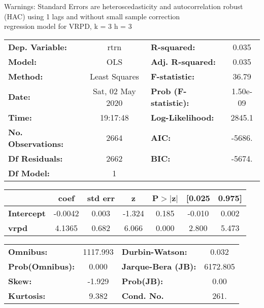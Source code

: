 Warnings: \newline
 [1] Standard Errors are heteroscedasticity and autocorrelation robust (HAC) using 1 lags and without small sample correction\\ 

regression model for VRPD, k = 3 h = 3\begin{center}
\begin{tabular}{lclc}
\toprule
\textbf{Dep. Variable:}    &       rtrn       & \textbf{  R-squared:         } &     0.035   \\
\textbf{Model:}            &       OLS        & \textbf{  Adj. R-squared:    } &     0.035   \\
\textbf{Method:}           &  Least Squares   & \textbf{  F-statistic:       } &     36.79   \\
\textbf{Date:}             & Sat, 02 May 2020 & \textbf{  Prob (F-statistic):} &  1.50e-09   \\
\textbf{Time:}             &     19:17:48     & \textbf{  Log-Likelihood:    } &    2845.1   \\
\textbf{No. Observations:} &        2664      & \textbf{  AIC:               } &    -5686.   \\
\textbf{Df Residuals:}     &        2662      & \textbf{  BIC:               } &    -5674.   \\
\textbf{Df Model:}         &           1      & \textbf{                     } &             \\
\bottomrule
\end{tabular}
\begin{tabular}{lcccccc}
                   & \textbf{coef} & \textbf{std err} & \textbf{z} & \textbf{P$> |$z$|$} & \textbf{[0.025} & \textbf{0.975]}  \\
\midrule
\textbf{Intercept} &      -0.0042  &        0.003     &    -1.324  &         0.185        &       -0.010    &        0.002     \\
\textbf{vrpd}      &       4.1365  &        0.682     &     6.066  &         0.000        &        2.800    &        5.473     \\
\bottomrule
\end{tabular}
\begin{tabular}{lclc}
\textbf{Omnibus:}       & 1117.993 & \textbf{  Durbin-Watson:     } &    0.032  \\
\textbf{Prob(Omnibus):} &   0.000  & \textbf{  Jarque-Bera (JB):  } & 6172.805  \\
\textbf{Skew:}          &  -1.929  & \textbf{  Prob(JB):          } &     0.00  \\
\textbf{Kurtosis:}      &   9.382  & \textbf{  Cond. No.          } &     261.  \\
\bottomrule
\end{tabular}
\end{center}

